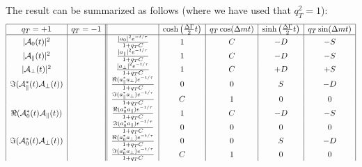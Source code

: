 \documentclass[a4paper,9pt,twosided]{article}
\begin{document}
The result can be summarized as follows (where we have used that $q_T^2=1$):
\begin{equation}
\begin{array}{| c |c|| c | c | c | c | c |}
 \hline
                        q_T=+1                      &    q_T = -1&                          &  \cosh\left(\frac{\Delta\Gamma}{2}t\right) & q_T \cos(\Delta m t)  & \sinh\left(\frac{\Delta\Gamma}{2}t\right) &q_T\sin(\Delta m t)  \\
 \hline
|{\cal A}_0(t)|^2                             &                                                                &\frac{  | a_0 |^2 e^{-t/\tau}}{1+q_TC}                  & 1 &   C  &  -D & -S   \\
|{\cal A}_\parallel(t)|^2                     &                                                                &\frac{  | a_\parallel |^2 e^{-t/\tau}}{1+q_TC}          & 1 &   C  &  -D & -S   \\
|{\cal A}_\perp(t)|^2                         &                                                                &\frac{  | a_\perp |^2 e^{-t/\tau}}{1+q_TC}              & 1 &   C  &  +D & +S   \\
\Im({\cal A}_\parallel^*(t){\cal A}_\perp(t)) &                                                                &\frac{  \Re(a_\parallel^* a_\perp)e^{-t/\tau}}{1+q_TC}  & 0 &   0  &   S & -D   \\                         
                                              &                                                                &\frac{  \Im(a_\parallel^* a_\perp)e^{-t/\tau}}{1+q_TC}  & C &   1  &   0 &  0   \\
\Re({\cal A}_0^*(t){\cal A}_\parallel(t))     &                                                                &\frac{  \Re(a_0^*a_\parallel)e^{-t/\tau}}{1+q_TC}       & 1 &   C  &  -D & -S   \\
                                              &                                                                &\frac{  \Im(a_0^*a_\parallel)e^{-t/\tau}}{1+q_TC}       & 0 &   0  &   0 &  0   \\
\Im({\cal A}_0^*(t){\cal A}_\perp(t))         &                                                                &\frac{  \Re(a_0^* a_\perp)e^{-t/\tau}}{1+q_TC}          & 0 &   0  &   S & -D   \\
                                              &                                                                &\frac{  \Im(a_0^* a_\perp)e^{-t/\tau}}{1+q_TC}          & C &   1  &   0 &  0   \\

\end{array}
\end{equation}
\end{document}
